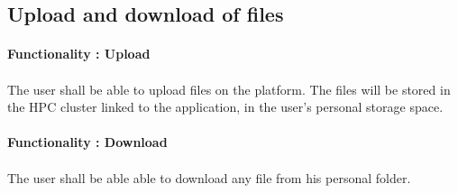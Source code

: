 \subsection{Upload and download of files}
  \paragraph{Functionality  : Upload}\paragraph{}
  The user shall be able to upload files on the platform. The files will be stored in the HPC cluster linked to the application, in the user's personal storage space.
  
  \paragraph{Functionality  : Download}\paragraph{}
  The user shall be able able to download any file from his personal folder.
  